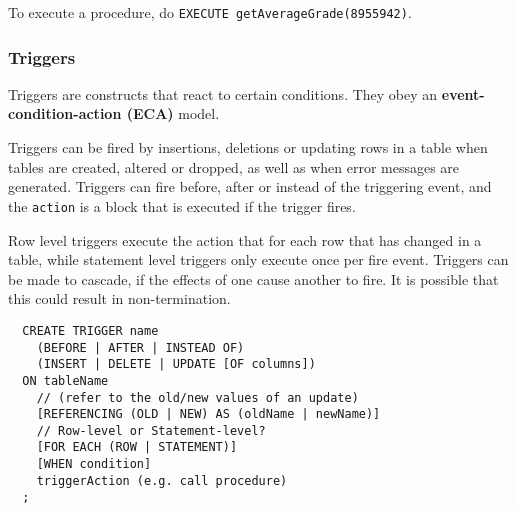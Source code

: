 To execute a procedure, do \texttt{EXECUTE getAverageGrade(8955942)}. 

\subsubsection{Triggers}

Triggers are constructs that react to certain conditions. They obey an \textbf
{event-condition-action (ECA)} model.

Triggers can be fired by insertions, deletions or updating rows in a table when
tables are created, altered or dropped, as well as when error messages are
generated. Triggers can fire before, after or instead of the triggering event,
and the \texttt{action} is a block that is executed if the trigger fires.

Row level triggers execute the action that for each row that has changed in a
table, while statement level triggers only execute once per fire event.
Triggers can be made to cascade, if the effects of one cause another to fire. It
is possible that this could result in non-termination.

\begin{verbatim}
  CREATE TRIGGER name
    (BEFORE | AFTER | INSTEAD OF)
    (INSERT | DELETE | UPDATE [OF columns])
  ON tableName
    // (refer to the old/new values of an update)
    [REFERENCING (OLD | NEW) AS (oldName | newName)]
    // Row-level or Statement-level?
    [FOR EACH (ROW | STATEMENT)]
    [WHEN condition]
    triggerAction (e.g. call procedure)
  ;
\end{verbatim}
